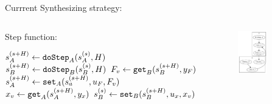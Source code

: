 \documentclass{beamer}
\begin{document}
\begin{frame}{Currrent Synthesizing strategy:}
\begin{columns}[T]
\begin{column}{.48\textwidth}
            \begin{algorithm}[H]
                \caption{Step function:}
                \begin{algorithmic}[1]
                  \scriptsize
                  \State $s_{A}^{(s+H)} \gets \mathtt{doStep}_{A}(s_{A}^{(s)}, H)$
                  \State $s_{B}^{(s+H)} \gets \mathtt{doStep}_{B}(s_{B}^{(s)}, H)$
                  \State $F_v \gets \mathtt{get}_{B}(s_{B}^{(s+H)}, y_{F})$
                  \State $s_{A}^{(s+H)} \gets \mathtt{set}_{A}(s_{a}^{(s+H)}, u_{F}, F_v)$
                  \State $x_v \gets \mathtt{get}_{A}(s_{A}^{(s+H)}, y_{x})$
                  \State $s_{B}^{(s)} \gets \mathtt{set}_{B}(s_{B}^{(s+H)}, u_{x}, x_v)$
                \end{algorithmic}
              \end{algorithm}
    \end{column}%
    \hfill%
    \begin{column}{.48\textwidth}
        \begin{figure}
            \centering
            \includegraphics[width=0.6\textwidth]{images/simple_master_2_step.pdf}
        \end{figure}
    \end{column}%
    \end{columns}
\end{frame}
\end{document}
